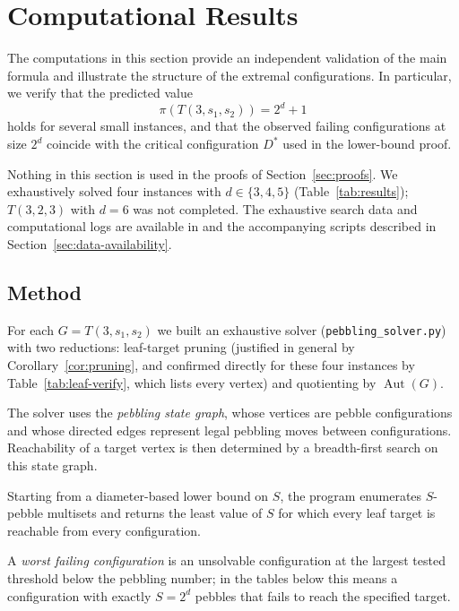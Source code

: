 
\section{Computational Results}\label{sec:computational}

The computations in this section provide an independent validation of the
main formula and illustrate the structure of the extremal configurations.
In particular, we verify that the predicted value
\[
\pi(T(3,s_1,s_2))=2^d+1
\]
holds for several small instances, and that the observed failing
configurations at size $2^d$ coincide with the critical configuration $D^*$
used in the lower-bound proof.

Nothing in this section is used in the proofs of Section~\ref{sec:proofs}.
We exhaustively solved four instances with
$d\in\{3,4,5\}$ (Table~\ref{tab:results});
$T(3,2,3)$ with $d=6$ was not completed.
The exhaustive search data and computational logs are available in
 and the accompanying scripts described
in Section~\ref{sec:data-availability}.


\subsection{Method}


For each $G=T(3,s_1,s_2)$ we built an exhaustive solver
(\texttt{pebbling\_solver.py}) with two reductions:
leaf-target pruning (justified in general by Corollary~\ref{cor:pruning},
and confirmed directly for these four instances by
Table~\ref{tab:leaf-verify}, which lists every vertex) and quotienting by
$\operatorname{Aut}(G)$.

The solver uses the \emph{pebbling state graph}, whose vertices are pebble
configurations and whose directed edges represent legal pebbling moves between
configurations. Reachability of a target vertex is then determined by a
breadth-first search on this state graph.

Starting from a diameter-based lower bound on $S$, the program enumerates
$S$-pebble multisets and returns the least value of $S$ for which every leaf
target is reachable from every configuration.

A \emph{worst failing configuration} is an unsolvable configuration at the
largest tested threshold below the pebbling number; in the tables below this
means a configuration with exactly $S=2^d$ pebbles that fails to reach the
specified target.


